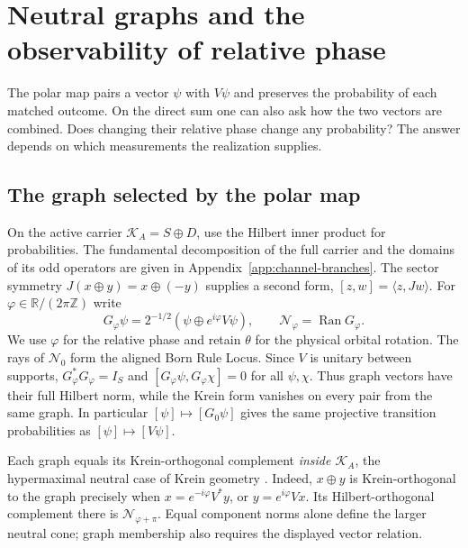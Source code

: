\documentclass[11pt]{article}
\theoremstyle{definition}
\DeclareMathOperator{\Ran}{Ran}
\newcommand{\R}{\mathbb R}
\begin{document}
\section{Neutral graphs and the observability of relative phase}
\label{sec:neutral-graphs-phase}

The polar map pairs a vector $\psi$ with $V\psi$ and preserves the probability of each matched outcome. On the direct sum one can also ask how the two vectors are combined. Does changing their relative phase change any probability? The answer depends on which measurements the realization supplies.

\subsection{The graph selected by the polar map}

On the active carrier $\mathcal K_A=S\oplus D$, use the Hilbert inner product for probabilities. The fundamental decomposition of the full carrier and the domains of its odd operators are given in Appendix~\ref{app:channel-branches}. The sector symmetry $J(x\oplus y)=x\oplus(-y)$ supplies a second form, $[z,w]=\langle z,Jw\rangle$. For $\varphi\in\R/(2\pi\mathbb Z)$ write
\[
 G_\varphi\psi=2^{-1/2}(\psi\oplus e^{i\varphi}V\psi),
 \qquad \mathcal N_\varphi=\Ran G_\varphi .
\]
We use $\varphi$ for the relative phase and retain $\theta$ for the physical orbital rotation. The rays of $\mathcal N_0$ form the aligned Born Rule Locus. Since $V$ is unitary between supports, $G_\varphi^*G_\varphi=I_S$ and $[G_\varphi\psi,G_\varphi\chi]=0$ for all $\psi,\chi$. Thus graph vectors have their full Hilbert norm, while the Krein form vanishes on every pair from the same graph. In particular $[\psi]\mapsto[G_0\psi]$ gives the same projective transition probabilities as $[\psi]\mapsto[V\psi]$.

Each graph equals its Krein-orthogonal complement \emph{inside $\mathcal K_A$}, the hypermaximal neutral case of Krein geometry \cite{Bognar1974}. Indeed, $x\oplus y$ is Krein-orthogonal to the graph precisely when $x=e^{-i\varphi}V^*y$, or $y=e^{i\varphi}Vx$. Its Hilbert-orthogonal complement there is $\mathcal N_{\varphi+\pi}$. Equal component norms alone define the larger neutral cone; graph membership also requires the displayed vector relation.
\end{document}
